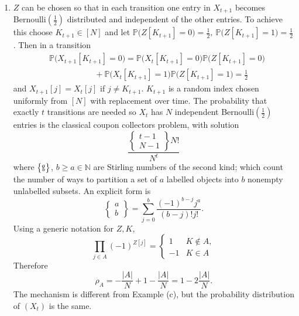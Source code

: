 \documentclass[preprint,11pt]{elsarticle}
\theoremstyle{remark}
\begin{document}
{\begin{enumerate}[label=(\alph*)]
\cite{CG2025} use the idea of the killing rate tending to zero  to obtain a limit theorem for level set sums in a Gaussian field.  In this example the limit Gaussian field is well defined on ${\cal V}_\infty$ but the random walk is not well defined on ${\cal V}_\infty$.
\item \label{item:04}
$Z$ can be chosen so that in each transition one entry in $X_{t+1}$ becomes Bernoulli$(\frac{1}{2})$ distributed and independent of the other entries. To achieve this choose $K_{t+1}\in [N]$ and let 
$
\mathbb{P}\big (Z[K_{t+1}]=0\big)= \frac{1}{2},\  \mathbb{P}\big (Z[K_{t+1}]=1\big)= \frac{1}{2}$.
%
Then in a transition
\begin{align*}
&\mathbb{P}\big (X_{t+1}[K_{t+1}]=0\big ) = 
\mathbb{P}\big (X_{t}[K_{t+1}]=0\big )\mathbb{P}\big (Z[K_{t+1}]=0\big)\\
&~~~~~~~~~~~~~~~~~~~~~~~~~+ \mathbb{P}\big (X_{t}[K_{t+1}]=1\big ) \mathbb{P}\big (Z[K_{t+1}]=1\big) = \frac{1}{2}
\end{align*}
and $X_{t+1}[j] = X_t[j]$ if $j\ne K_{t+1}$. $K_{t+1}$ is a random index chosen uniformly from $[N]$ with replacement over time.
The probability that exactly $t$ transitions are needed so $X_t$ has $N$ independent Bernoulli$(\frac{1}{2})$ entries is the classical coupon collectors problem, with solution 
\[
\frac{{\begin{Bmatrix} t-1\\[-3.25pt]N-1 \end{Bmatrix} N!}}{N^t}
\]
where ${\scriptsize \begin{Bmatrix} a\\[-3.25pt] b \end{Bmatrix}}$, $b\geq a \in \mathbb{N}$ are Stirling numbers of the second kind; which count the number of ways to partition a set of $a$ labelled objects into $b$ nonempty unlabelled subsets.  An explicit form is
\[
\begin{Bmatrix} a\\[-3.25pt] b \end{Bmatrix} =
\sum_{j=0}^b\frac{(-1)^{b-j}j^a}{(b-j)!j!}.
\]
 Using a generic notation for $Z,K$, 
\[
\prod_{j\in A}(-1)^{Z[j]} =
\begin{cases}
1&K \not\in A,\\
-1&K \in A
\end{cases}
\]
Therefore
\[
\rho_A = -\frac{|A|}{N} + 1 - \frac{|A|}{N} = 1 - 2\frac{|A|}{N}.
\]
The mechanism is different from Example (c), but the probability distribution of $(X_t)$ is the same.%

\end{enumerate}}
\end{document}
